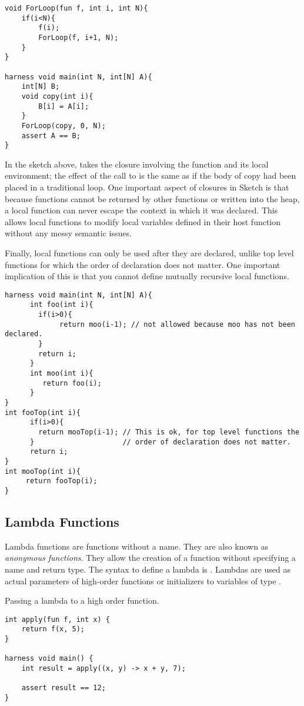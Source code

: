 \begin{lstlisting}
void ForLoop(fun f, int i, int N){
	if(i<N){
		f(i);
		ForLoop(f, i+1, N);
	}
}

harness void main(int N, int[N] A){
	int[N] B;
	void copy(int i){
		B[i] = A[i];
	}
	ForLoop(copy, 0, N);
	assert A == B;
}
\end{lstlisting}

In the sketch above,  takes the closure involving the function  and its local environment; the effect of the call to  is the same as if the body of copy had been placed in a traditional  loop.
One important aspect of closures in Sketch is that because functions cannot be returned by other functions or written into the heap, a local function can never escape the context in which it was declared. This allows local functions to modify local variables defined in their host function without any messy semantic issues.

Finally, local functions can only be used after they are declared, unlike top level functions for which the order of declaration does not matter. One important implication of this is that you cannot define mutually recursive local functions.

\begin{lstlisting}
harness void main(int N, int[N] A){
      int foo(int i){
        if(i>0){
             return moo(i-1); // not allowed because moo has not been declared.
        }
        return i;
      }
      int moo(int i){
         return foo(i);
      }
}
int fooTop(int i){
      if(i>0){
        return mooTop(i-1); // This is ok, for top level functions the
      }                     // order of declaration does not matter.
      return i;
}
int mooTop(int i){
     return fooTop(i);
}
\end{lstlisting}


\subsection{Lambda Functions}

Lambda functions are functions without a name. They are also known as \textit{anonymous functions}. They allow the creation of a function without specifying a name and return type. The syntax to define a lambda is . Lambdas are used as actual parameters of high-order functions or initializers to variables of type .

\begin{Example}
Passing a lambda to a high order function.
\begin{lstlisting}
int apply(fun f, int x) {
    return f(x, 5);
}

harness void main() {
    int result = apply((x, y) -> x + y, 7);

    assert result == 12;
}
\end{lstlisting}

\end{Example}

